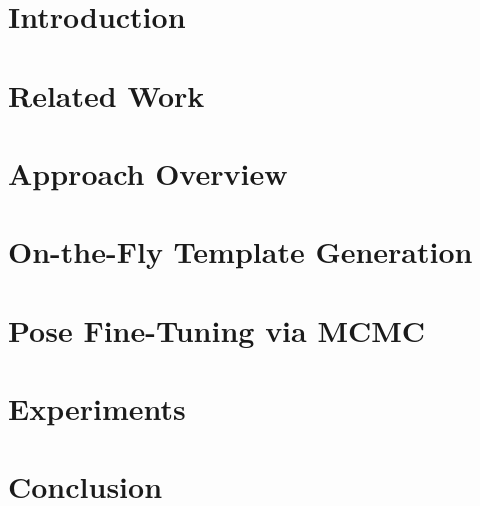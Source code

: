 \documentclass[10pt,twocolumn,letterpaper]{article}
\begin{document}
\begin{abstract}

\end{abstract}

\section{Introduction}
\label{sec:intro}

%
\section{Related Work}
\label{sec:related}



\section{Approach Overview}
\label{sec:nz-who}


\section{On-the-Fly Template Generation}
\label{sec:approach}


\section{Pose Fine-Tuning via MCMC}
\label{sec:fine}


\section{Experiments}
\label{sec:experiments}


\section{Conclusion}
\label{conclusion}
\vspace{-.2cm}


\clearpage
\clearpage
{\small


}
\end{document}
